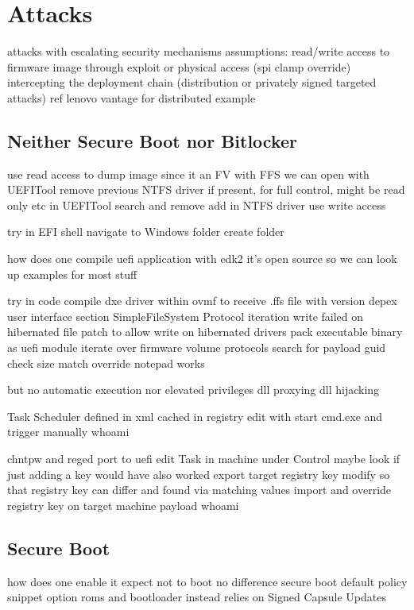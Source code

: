 
\chapter{Attacks}

attacks with escalating security mechanisms
assumptions:
read/write access to firmware image through
exploit or physical access (spi clamp override)
intercepting the deployment chain (distribution or privately signed targeted attacks)
ref lenovo vantage for distributed example



\section{Neither Secure Boot nor Bitlocker}
use read access to dump image
since it an FV with FFS we can open with UEFITool
remove previous NTFS driver if present, for full control, might be read only etc
in UEFITool search and remove
add in NTFS driver
use write access

try in EFI shell
navigate to Windows folder
create folder

how does one compile uefi application with edk2
it's open source so we can look up examples for most stuff

try in code
compile dxe driver within ovmf to receive .ffs file with version depex user interface section
SimpleFileSystem Protocol iteration
write failed on hibernated file
patch to allow write on hibernated drivers
pack executable binary as uefi module
iterate over firmware volume protocols
search for payload guid
check size match
override notepad works

but no automatic execution nor elevated privileges
dll proxying
dll hijacking

Task Scheduler
defined in xml
cached in registry
edit with start cmd.exe and trigger manually
whoami

chntpw and reged
port to uefi
edit Task in machine under Control
maybe look if just adding a key would have also worked
export target registry key
modify so that registry key can differ and found via matching values
import and override registry key on target machine
payload whoami


\section{Secure Boot}
how does one enable it
expect not to boot
no difference
secure boot default policy snippet
option roms and bootloader
instead relies on Signed Capsule Updates


